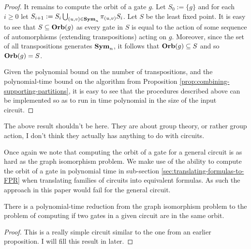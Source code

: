 \documentclass[../paper.tex]{subfiles}
\begin{document}
\begin{proof}
  It remains to compute the orbit of a gate $g$. Let $S_0 := \{g\}$ and for each
  $i \geq 0$ let $S_{i+1} := S_i \bigcup_{(u,v) \in \text{\textbf{Sym}}_n} \pi_{(u,v)}S_i$. Let
  $S$ be the least fixed point. It is easy to see that $S \subseteq \text{\textbf{Orb}}(g)$ as
  every gate in $S$ is equal to the action of some sequence of automorphisms
  (extending transpositions) acting on $g$. Moreover, since the set of all
  transpositions generates $\text{\textbf{Sym}}_n$, it follows that $\text{\textbf{Orb}}(g) \subseteq S$ and
  so $\text{\textbf{Orb}}(g) = S$.

  Given the polynomial bound on the number of transpositions, and the
  polynomial-time bound on the algorithm from Proposition
  \ref{prop:combining-supporting-partitions}, it is easy to see that the
  procedures described above can be implemented so as to run in time polynomial
  in the size of the input circuit.
\end{proof}

\begin{remark}
  The above result shouldn't be here. They are about group theory, or rather
  group action, I don't think they actually has anything to do with circuits.
\end{remark}

Once again we note that computing the orbit of a gate for a general circuit is
as hard as the graph isomorphism problem. We make use of the ability to compute
the orbit of a gate in polynomial time in sub-section
\ref{sec:translating-formulas-to-FPR} when translating families of circuits into
equivalent formulas. As such the approach in this paper would fail for the
general circuit.

\begin{prop}
  There is a polynomial-time reduction from the graph isomorphism problem to the
  problem of computing if two gates in a given circuit are in the same orbit.
\end{prop}
\begin{proof}
  This is a really simple circuit similar to the one from an earlier
  proposition. I will fill this result in later.
\end{proof}



\end{document}
